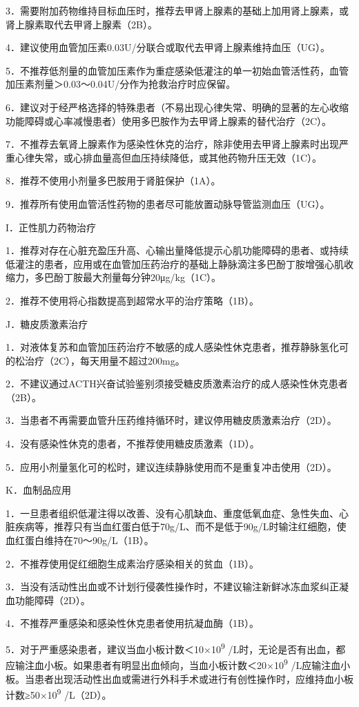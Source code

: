 3．需要附加药物维持目标血压时，推荐去甲肾上腺素的基础上加用肾上腺素，或肾上腺素取代去甲肾上腺素（2B）。

4．建议使用血管加压素0.03U/分联合或取代去甲肾上腺素维持血压（UG）。

5．不推荐低剂量的血管加压素作为重症感染低灌注的单一初始血管活性药，血管加压素剂量＞0.03～0.04U/分作为抢救治疗时应保留。

6．建议对于经严格选择的特殊患者（不易出现心律失常、明确的显著的左心收缩功能障碍或心率减慢患者）使用多巴胺作为去甲肾上腺素的替代治疗（2C）。

7．不推荐去氧肾上腺素作为感染性休克的治疗，除非使用去甲肾上腺素时出现严重心律失常，或心排血量高但血压持续降低，或其他药物升压无效（1C）。

8．推荐不使用小剂量多巴胺用于肾脏保护（1A）。

9．推荐所有使用血管活性药物的患者尽可能放置动脉导管监测血压（UG）。

I．正性肌力药物治疗

1．推荐对存在心脏充盈压升高、心输出量降低提示心肌功能障碍的患者、或持续低灌注的患者，应用或在血管加压药治疗的基础上静脉滴注多巴酚丁胺增强心肌收缩力，多巴酚丁胺最大剂量每分钟20μg/kg（1C）。

2．推荐不使用将心指数提高到超常水平的治疗策略（1B）。

J．糖皮质激素治疗

1．对液体复苏和血管加压药治疗不敏感的成人感染性休克患者，推荐静脉氢化可的松治疗（2C），每天用量不超过200mg。

2．不建议通过ACTH兴奋试验鉴别须接受糖皮质激素治疗的成人感染性休克患者（2B）。

3．当患者不再需要血管升压药维持循环时，建议停用糖皮质激素治疗（2D）。

4．没有感染性休克的患者，不推荐使用糖皮质激素（1D）。

5．应用小剂量氢化可的松时，建议连续静脉使用而不是重复冲击使用（2D）。

K．血制品应用

1．一旦患者组织低灌注得以改善、没有心肌缺血、重度低氧血症、急性失血、心脏疾病等，推荐只有当血红蛋白低于70g/L、而不是低于90g/L时输注红细胞，使血红蛋白维持在70～90g/L（1B）。

2．不推荐使用促红细胞生成素治疗感染相关的贫血（1B）。

3．当没有活动性出血或不计划行侵袭性操作时，不建议输注新鲜冰冻血浆纠正凝血功能障碍（2D）。

4．不推荐严重感染和感染性休克患者使用抗凝血酶（1B）。

5．对于严重感染患者，建议当血小板计数＜10×10\textsuperscript{9}
/L时，无论是否有出血，都应输注血小板。如果患者有明显出血倾向，当血小板计数＜20×10\textsuperscript{9}
/L应输注血小板。当患者出现活动性出血或需进行外科手术或进行有创性操作时，应维持血小板计数≥50×10\textsuperscript{9}
/L（2D）。

